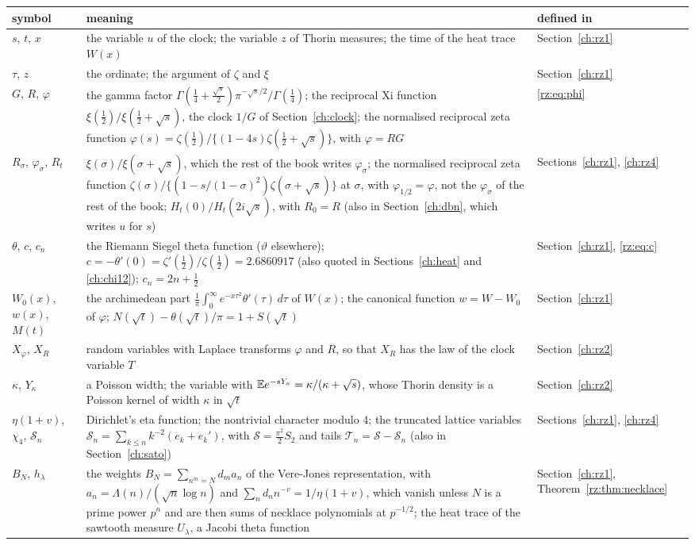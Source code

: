 {\small
\begin{longtable}{@{}p{}p{}p{}@{}}
\toprule
symbol & meaning & defined in\\
\midrule
\endhead
$s$, $t$, $x$ & \raggedright the variable $u$ of the clock; the variable $z$ of Thorin measures; the time of the heat trace $W(x)$ & \raggedright Section~\ref{ch:rz1}\tabularnewline
$\tau$, $z$ & \raggedright the ordinate; the argument of $\zeta$ and $\xi$ & \raggedright Section~\ref{ch:rz1}\tabularnewline
$G$, $R$, $\varphi$ & \raggedright the gamma factor ${\Gamma(\frac14+\frac{\sqrt s}2)\pi^{-\sqrt s/2}/\Gamma(\frac14)}$; the reciprocal Xi function ${\xi(\frac12)/\xi(\frac12+\sqrt s)}$, the clock $1/G$ of Section~\ref{ch:clock}; the normalised reciprocal zeta function ${\varphi(s)=\zeta(\frac12)/\{(1-4s)\zeta(\frac12+\sqrt s)\}}$, with ${\varphi=RG}$ & \raggedright \eqref{rz:eq:phi}\tabularnewline
$R_\sigma$, $\varphi_\sigma$, $R_t$ & \raggedright ${\xi(\sigma)/\xi(\sigma+\sqrt s)}$, which the rest of the book writes $\varphi_\sigma$; the normalised reciprocal zeta function ${\zeta(\sigma)/\{(1-s/(1-\sigma)^2)\zeta(\sigma+\sqrt s)\}}$ at $\sigma$, with ${\varphi_{1/2}=\varphi}$, not the $\varphi_\sigma$ of the rest of the book; ${H_t(0)/H_t(2i\sqrt s)}$, with ${R_0=R}$ (also in Section~\ref{ch:dbn}, which writes $u$ for $s$) & \raggedright Sections~\ref{ch:rz1}, \ref{ch:rz4}\tabularnewline
$\theta$, $c$, $c_n$ & \raggedright the Riemann Siegel theta function ($\vartheta$ elsewhere); ${c=-\theta'(0)=\zeta'(\frac12)/\zeta(\frac12)=2.6860917}$ (also quoted in Sections~\ref{ch:heat} and \ref{ch:chi12}); ${c_n=2n+\frac12}$ & \raggedright Section~\ref{ch:rz1}, \eqref{rz:eq:c}\tabularnewline
$W_0(x)$, $w(x)$, $M(t)$ & \raggedright the archimedean part ${\frac1\pi\int_0^\infty e^{-x\tau^2}\theta'(\tau)\,d\tau}$ of $W(x)$; the canonical function ${w=W-W_0}$ of $\varphi$; ${N(\sqrt t)-\theta(\sqrt t)/\pi=1+S(\sqrt t)}$ & \raggedright Section~\ref{ch:rz1}\tabularnewline
$X_\varphi$, $X_R$ & \raggedright random variables with Laplace transforms $\varphi$ and $R$, so that $X_R$ has the law of the clock variable $T$ & \raggedright Section~\ref{ch:rz2}\tabularnewline
$\kappa$, $Y_\kappa$ & \raggedright a Poisson width; the variable with ${\mathbb{E} e^{-sY_\kappa}=\kappa/(\kappa+\sqrt s)}$, whose Thorin density is a Poisson kernel of width $\kappa$ in $\sqrt t$ & \raggedright Section~\ref{ch:rz2}\tabularnewline
$\eta(1+v)$, $\chi_4$, $\mathcal S_n$ & \raggedright Dirichlet's eta function; the nontrivial character modulo $4$; the truncated lattice variables ${\mathcal S_n=\sum_{k\le n}k^{-2}(e_k+e_k')}$, with ${\mathcal S=\frac{\pi^2}2S_2}$ and tails ${\mathcal T_n=\mathcal S-\mathcal S_n}$ (also in Section~\ref{ch:sato}) & \raggedright Sections~\ref{ch:rz1}, \ref{ch:rz4}\tabularnewline
$B_N$, $h_\lambda$ & \raggedright the weights ${B_N=\sum_{n^m=N}d_ma_n}$ of the Vere-Jones representation, with ${a_n=\Lambda(n)/(\sqrt n\log n)}$ and ${\sum_nd_nn^{-v}=1/\eta(1+v)}$, which vanish unless $N$ is a prime power $p^n$ and are then sums of necklace polynomials at $p^{-1/2}$; the heat trace of the sawtooth measure $U_\lambda$, a Jacobi theta function & \raggedright Section~\ref{ch:rz1}, Theorem~\ref{rz:thm:necklace}\tabularnewline
\bottomrule
\end{longtable}}
